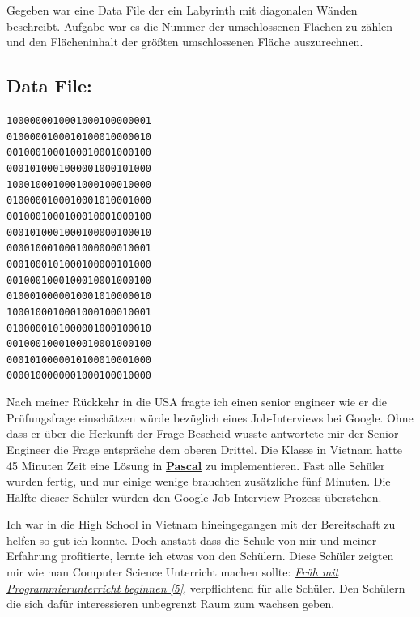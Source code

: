 Gegeben war eine Data File der ein Labyrinth mit diagonalen Wänden beschreibt. Aufgabe war es die Nummer der umschlossenen Flächen zu zählen und den Flächeninhalt der größten umschlossenen Fläche auszurechnen.

\subsection*{Data File:}
\large
\texttt{1000000010001000100000001 \\
0100000100010100010000010 \\
0010001000100010001000100 \\
0001010001000001000101000 \\
1000100010001000100010000 \\
0100000100010001010001000 \\
0010001000100010001000100 \\
0001010001000100000100010 \\
0000100010001000000010001 \\
0001000101000100000101000 \\
0010001000100010001000100 \\
0100010000010001010000010 \\
1000100010001000100010001 \\
0100000101000001000100010 \\
0010001000100010001000100 \\
0001010000010100010001000 \\
0000100000001000100010000 \\
}
\normalsize 


Nach meiner Rückkehr in die USA fragte ich einen senior engineer wie er die Prüfungsfrage einschätzen würde bezüglich eines Job-Interviews bei Google. Ohne dass er über die Herkunft der Frage Bescheid wusste antwortete mir der Senior Engineer die Frage entspräche dem oberen Drittel. Die Klasse in Vietnam hatte 45 Minuten Zeit eine Lösung in \href{http://de.wikipedia.org/wiki/Pascal_(Programmiersprache)}{\textbf{Pascal}} zu implementieren. Fast alle Schüler wurden fertig, und nur einige wenige brauchten zusätzliche fünf Minuten. Die Hälfte dieser Schüler würden den Google Job Interview Prozess überstehen.

Ich war in die High School in Vietnam hineingegangen mit der Bereitschaft zu helfen so gut ich konnte. Doch anstatt dass die Schule von mir und meiner Erfahrung profitierte, lernte ich etwas von den Schülern. Diese Schüler zeigten mir wie man Computer Science Unterricht machen sollte: \href{http://neil.fraser.name/news/2012/07/01/}{\textit{Fr\"uh mit Programmierunterricht beginnen [5]}}, verpflichtend für alle Schüler. Den Schülern die sich dafür interessieren unbegrenzt Raum zum wachsen geben.

